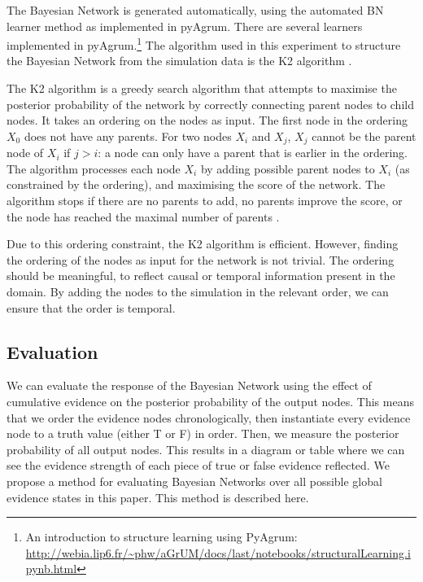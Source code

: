 \documentclass[12pt]{article}
\begin{document}
The Bayesian Network is generated automatically, using the automated BN learner method as implemented in pyAgrum. There are several learners implemented in pyAgrum.\footnote{An introduction to structure learning using PyAgrum: \url{http://webia.lip6.fr/~phw/aGrUM/docs/last/notebooks/structuralLearning.ipynb.html}} The algorithm used in this experiment to structure the Bayesian Network from the simulation data is the K2 algorithm \citep{Cooper1992}. 

The K2 algorithm is a greedy search algorithm that attempts to maximise the posterior probability of the network by correctly connecting parent nodes to child nodes. It takes an ordering on the nodes as input. The first node in the ordering $X_0$ does not have any parents. For two nodes $X_i$ and $X_j$, $X_j$ cannot be the parent node of $X_i$ if $j > i$: a node can only have a parent that is earlier in the ordering. The algorithm processes each node $X_i$ by adding possible parent nodes to $X_i$ (as constrained by the ordering), and maximising the score of the network. The algorithm stops if there are no parents to add, no parents improve the score, or the node has reached the maximal number of parents \citep{Chen2008}.

Due to this ordering constraint, the K2 algorithm is efficient. However, finding the ordering of the nodes as input for the network is not trivial. The ordering should be meaningful, to reflect causal or temporal information present in the domain. By adding the nodes to the simulation in the relevant order, we can ensure that the order is temporal. 



\subsection{Evaluation}

We can evaluate the response of the Bayesian Network using the effect of cumulative evidence on the posterior probability of the output nodes. This means that we order the evidence nodes chronologically, then instantiate every evidence node to a truth value (either T or F) in order. Then, we measure the posterior probability of all output nodes. This results in a diagram or table where we can see the evidence strength of each piece of true or false evidence reflected. We propose a method for evaluating Bayesian Networks over all possible global evidence states in this paper. This method is described here.
\end{document}
